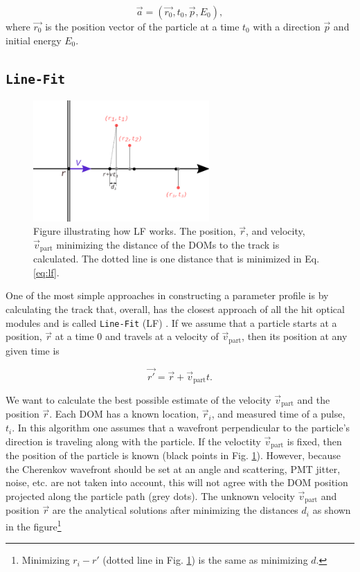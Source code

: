 \begin{equation}
\label{eq:vec}
\vec{a} = (\vec{r_0},t_0,\vec{p},E_0),
\end{equation}
\noindent where $\vec{r_0}$ is the position vector of the particle at a time $t_0$ with a direction $\vec{p}$ and initial energy $E_0$. 

\subsection{\texttt{Line-Fit}}
\label{subsec:lf}

\begin{figure}
\centering
\includegraphics[width=0.6\textwidth]{chapter7/img/linefit.png}
\caption{Figure illustrating how LF works. The position, $\vec{r}$, and velocity, $\vec{v}_\textrm{part}$ minimizing the distance of the DOMs to the track is calculated. The dotted line is one distance that is minimized in Eq. \ref{eq:lf}.}
\label{fig:lf}
\end{figure}

\noindent One of the most simple approaches in constructing a parameter profile is by calculating the track that, overall, has the closest approach of all the hit optical modules and is called \texttt{Line-Fit} (LF) \cite{Ahrens:2003fg}. If we assume that a particle starts at a position, $\vec{r}$ at a time 0 and travels at a velocity of $\vec{v}_\textrm{part}$, then its position at any given time is

\begin{equation}
\vec{r'} = \vec{r} + \vec{v}_{\textrm{part}}t.
\end{equation}

\noindent We want to calculate the best possible estimate of the velocity $\vec{v}_\textrm{part}$ and the position $\vec{r}$. Each DOM has a known location, $\vec{r}_i$, and measured time of a pulse, $t_i$. In this algorithm one assumes that a wavefront perpendicular to the particle's direction is traveling along with the particle. If the veloctity $\vec{v}_\textrm{part}$ is fixed, then the position of the particle is known (black points in Fig. \ref{fig:lf}). However, because the Cherenkov wavefront should be set at an angle and scattering, PMT jitter, noise, etc. are not taken into account, this will not agree with the DOM position projected along the particle path (grey dots). The unknown velocity $\vec{v}_\textrm{part}$ and position $\vec{r}$ are the analytical solutions after minimizing the distances $d_i$ as shown in the figure\footnote{Minimizing $r_i - r'$ (dotted line in Fig. \ref{fig:lf}) is the same as minimizing $d$.}

